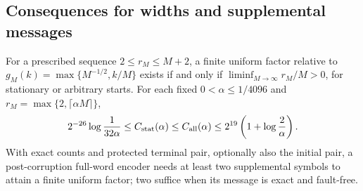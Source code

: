 \subsection{Consequences for widths and supplemental messages}

\begin{proposition}
\label{prop:lower-consequences}
For a prescribed sequence $2\le r_M\le M+2$, a finite uniform factor
relative to $g_M(k)=\max\{M^{-1/2},k/M\}$ exists if and only if
$\liminf_{M\to\infty}r_M/M>0$, for stationary or arbitrary starts.
For each fixed $0<\alpha\le1/4096$ and
$r_M=\max\{2,\lceil\alpha M\rceil\}$,
\[
 2^{-26}\log\frac1{32\alpha}
 \le C_{\rm stat}(\alpha)
 \le C_{\rm all}(\alpha)
 \le2^{19}\left(1+\log\frac2\alpha\right).
\]
With exact counts and protected terminal pair, optionally also the
initial pair, a post-corruption full-word encoder needs at least two
supplemental symbols to attain a finite uniform factor; two suffice
when its message is exact and fault-free.
\end{proposition}
